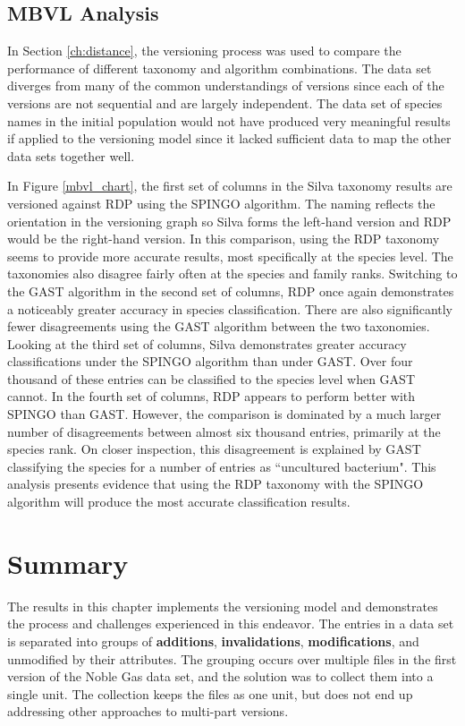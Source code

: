 \subsection{MBVL Analysis}

In Section \ref{ch:distance}, the versioning process was used to compare the performance of different taxonomy and algorithm combinations.
The data set diverges from many of the common understandings of versions since each of the versions are not sequential and are largely independent.
The data set of species names in the initial population would not have produced very meaningful results if applied to the versioning model since it lacked sufficient data to map the other data sets together well.

In Figure \ref{mbvl_chart}, the first set of columns in the Silva taxonomy results are versioned against RDP using the SPINGO algorithm.
The naming reflects the orientation in the versioning graph so Silva forms the left-hand version and RDP would be the right-hand version.
In this comparison, using the RDP taxonomy seems to provide more accurate results, most specifically at the species level.
The taxonomies also disagree fairly often at the species and family ranks.
Switching to the GAST algorithm in the second set of columns, RDP once again demonstrates a noticeably greater accuracy in species classification.
There are also significantly fewer disagreements using the GAST algorithm between the two taxonomies.
Looking at the third set of columns, Silva demonstrates greater accuracy classifications under the SPINGO algorithm than under GAST.
Over four thousand of these entries can be classified to the species level when GAST cannot.
In the fourth set of columns, RDP appears to perform better with SPINGO than GAST.
However, the comparison is dominated by a much larger number of disagreements between almost six thousand entries, primarily at the species rank.
On closer inspection, this disagreement is explained by GAST classifying the species for a number of entries as ``uncultured bacterium".
This analysis presents evidence that using the RDP taxonomy with the SPINGO algorithm will produce the most accurate classification results.

\section{Summary}

The results in this chapter implements the versioning model and demonstrates the process and challenges experienced in this endeavor.
The entries in a data set is separated into groups of \textbf{additions}, \textbf{invalidations}, \textbf{modifications}, and unmodified by their attributes.
The grouping occurs over multiple files in the first version of the Noble Gas data set, and the solution was to collect them into a single unit.
The collection keeps the files as one unit, but does not end up addressing other approaches to multi-part versions.

